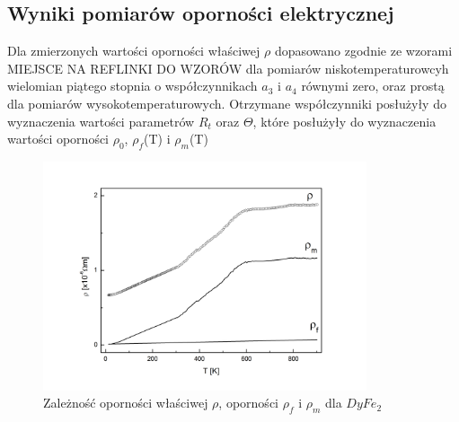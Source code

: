 \documentclass[a4paper,12pt]{article}
\numberwithin{equation}{section}
\begin{document}
\renewcommand{\thetable}{\arabic{section}.\arabic{table}}


\subsection{Wyniki pomiarów oporności elektrycznej}

Dla zmierzonych wartości oporności właściwej $\rho$ dopasowano zgodnie ze wzorami MIEJSCE NA REFLINKI DO WZORÓW
dla pomiarów niskotemperaturowcyh wielomian piątego stopnia o współczynnikach $a_3$ i $a_4$ równymi zero, oraz prostą dla
pomiarów wysokotemperaturowych. Otrzymane współczynniki posłużyły do wyznaczenia wartości parametrów  $R_t$ oraz
$\Theta$, które posłużyły do wyznaczenia wartości oporności $\rho_0$, $\rho_f$(T) i $\rho_m$(T)





\begin{figure}[ht]
    \centering
    \includegraphics[width =0.85\textwidth]{../img/opor/skladoweDy}
    \caption{Zależność oporności właściwej $\rho$, oporności $\rho_f$ i $\rho_m$ dla $DyFe_2$}
    \label{skladoweDy}
\end{figure}
\end{document}
